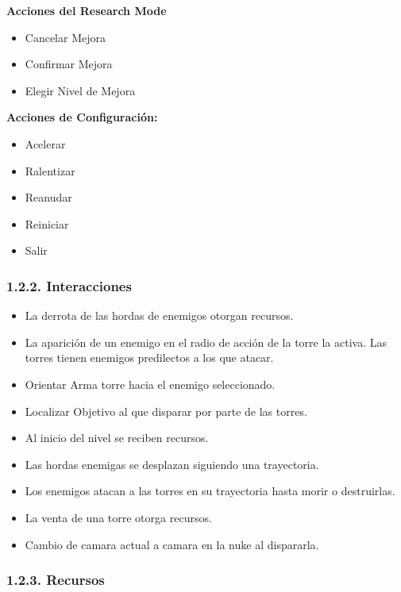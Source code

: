 \documentclass{article}
\begin{document}
\hfill \break \textbf{Acciones del Research Mode}

\begin{itemize}
    \item Cancelar Mejora
    \item Confirmar Mejora
    \item Elegir Nivel de Mejora
\end{itemize}

\clearpage \textbf{Acciones de Configuración:}

\begin{itemize}
    \item Acelerar
    \item Ralentizar
    \item Reanudar
    \item Reiniciar
    \item Salir
\end{itemize}

\subsubsection{1.2.2. Interacciones}

\begin{itemize}
    \item La derrota de las hordas de enemigos otorgan recursos.
    \item La aparición de un enemigo en el radio de acción de la torre la activa. Las torres tienen enemigos predilectos a los que atacar.
    \item Orientar Arma torre hacia el enemigo seleccionado.
    \item Localizar Objetivo al que disparar por parte de las torres.
    \item Al inicio del nivel se reciben recursos.
    \item Las hordas enemigas se desplazan siguiendo una trayectoria.
    \item Los enemigos atacan a las torres en su trayectoria hasta morir o destruirlas.
    \item La venta de una torre otorga recursos.
    \item Cambio de camara actual a camara en la nuke al dispararla. 
\end{itemize}

\subsubsection{1.2.3. Recursos}
\end{document}
